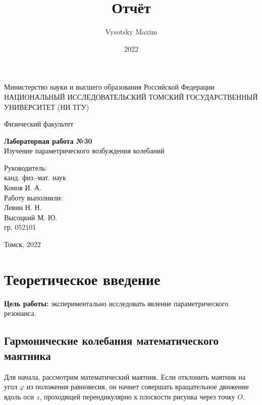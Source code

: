 \documentclass[a4paper,12pt]{article}
\author{Vysotsky Maxim}
\title{Отчёт}
\date{2022}
\begin{document}
	\begin{titlepage}
		\begin{center}
			{Министерство науки и высшего образования Российской Федерации
				НАЦИОНАЛЬНЫЙ ИССЛЕДОВАТЕЛЬСКИЙ ТОМСКИЙ
				ГОСУДАРСТВЕННЫЙ УНИВЕРСИТЕТ (НИ ТГУ)}
		\end{center}
		\begin{center}
			{Физический факультет}
		\end{center}
		
		
		\vspace{8cm}
		{
			\begin{center}
				{\bf Лабораторная работа №30}\\
				Изучение параметрического возбуждения колебаний
			\end{center}
		}
		\vspace{2cm}
		\begin{flushright}
			{Руководитель:\\ канд. физ.-мат. наук\\
				Конов И. А. \\
				Работу выполнили:\\
				Левин Н. Н. \\
				Высоцкий М. Ю.\\
				\vspace{0.2cm}
				гр. 052101}
		\end{flushright}
		\vspace{3cm}
		\begin{center}
			Томск, 2022
		\end{center}
	\end{titlepage}

\section{Теоретическое введение}
\hspace{\parindent}\textbf{Цель работы:} экспериментально исследовать явление параметрического резонанса.

\subsection{Гармонические колебания математического маятника}
Для начала, рассмотрим математический маятник. Если отклонить маятник на угол $\varphi$ из положения равновесия, он начнет совершать вращательное движение вдоль оси $z$, проходящей перендикулярно к плоскости рисунка через точку $O$.
\end{document}
